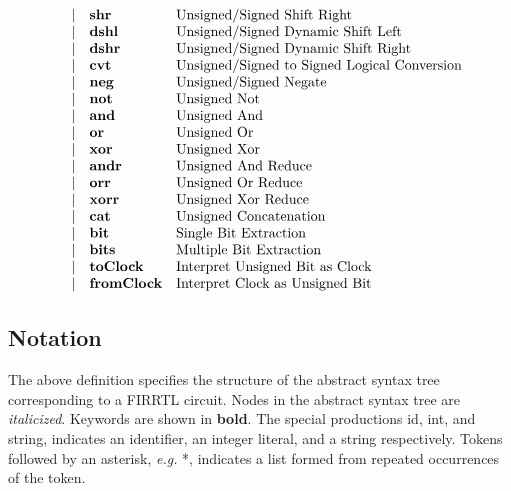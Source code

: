 \documentclass[12pt]{article}
\begin{document}
\[{\begin{array}{rrll}
              &\vert           &\text{\bf shr}            &\text{Unsigned/Signed Shift Right}\\
              &\vert           &\text{\bf dshl}           &\text{Unsigned/Signed Dynamic Shift Left}\\
              &\vert           &\text{\bf dshr}           &\text{Unsigned/Signed Dynamic Shift Right}\\
              &\vert           &\text{\bf cvt}            &\text{Unsigned/Signed to Signed Logical Conversion}\\
              &\vert           &\text{\bf neg}            &\text{Unsigned/Signed Negate}\\
              &\vert           &\text{\bf not}            &\text{Unsigned Not}\\
              &\vert           &\text{\bf and}            &\text{Unsigned And}\\
              &\vert           &\text{\bf or}             &\text{Unsigned Or}\\
              &\vert           &\text{\bf xor}            &\text{Unsigned Xor}\\
              &\vert           &\text{\bf andr}           &\text{Unsigned And Reduce}\\
              &\vert           &\text{\bf orr}            &\text{Unsigned Or Reduce}\\
              &\vert           &\text{\bf xorr}           &\text{Unsigned Xor Reduce}\\
              &\vert           &\text{\bf cat}            &\text{Unsigned Concatenation}\\
              &\vert           &\text{\bf bit}            &\text{Single Bit Extraction}\\
              &\vert           &\text{\bf bits}           &\text{Multiple Bit Extraction}\\
              &\vert           &\text{\bf toClock}        &\text{Interpret Unsigned Bit as Clock}\\
              &\vert           &\text{\bf fromClock}      &\text{Interpret Clock as Unsigned Bit}
\end{array}
}
\]

\subsection{Notation}
The above definition specifies the structure of the abstract syntax tree corresponding to a FIRRTL circuit.
Nodes in the abstract syntax tree are {\em italicized}.
Keywords are shown in {\bf bold}.
The special productions id, int, and string, indicates an identifier, an integer literal, and a string respectively.
Tokens followed by an asterisk, {\em e.g.} *, indicates a list formed from repeated occurrences of the token.
\end{document}

